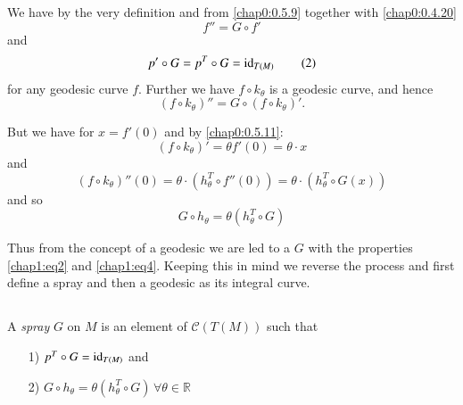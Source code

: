 We have by the very definition and from \ref{chap0:0.5.9} together with
\ref{chap0:0.4.20}
\begin{equation*}
f''=G\circ f'\tag{1}\label{chap1:eq1}
\end{equation*}
and
\begin{equation*}
p'\circ G=p^{T}\circ G=\operatorname{id}_{T(M)}\tag{2}\label{chap1:eq2}
\end{equation*}
for any geodesic curve $f$. Further we have $f\circ k_{\theta}$ is a
geodesic curve, and hence
\begin{equation*}
(f\circ k_{\theta})''=G\circ (f\circ k_{\theta})'.\tag{3}\label{chap1:eq3}
\end{equation*}

But we have for $x=f'(0)$ and by \ref{chap0:0.5.11}:
$$
(f\circ k_{\theta})'=\theta f'(0)=\theta\cdot x
$$
and
$$
(f\circ k_{\theta})''(0)=\theta\cdot (h^{T}_{\theta}\circ
f''(0))=\theta\cdot (h^{T}_{\theta}\circ G(x))
$$
and so
\begin{equation*}
G\circ h_{\theta}=\theta(h^{T}_{\theta}\circ G)\tag{4}\label{chap1:eq4}
\end{equation*}

Thus from the concept of a geodesic we are led to a $G$ with the
properties \eqref{chap1:eq2} and \eqref{chap1:eq4}. Keeping this in
mind we reverse the process and \pageoriginale first define a spray and
then a geodesic as its integral curve.

\setcounter{definition}{0}

\subsection{}\label{chap1:1.1.1}

\begin{defi*}
A {\em spray} $G$ on $M$ is an element of $\mathscr{C}(T(M))$ such
that
\begin{itemize}
\item[\rm 1)] $p^{T}\circ G=\operatorname{id}_{T(M)}$ and

\item[\rm 2)] $G\circ h_{\theta}=\theta(h^{T}_{\theta}\circ G) \, \forall
  \theta\in \mathbb{R}$
\end{itemize}
\end{defi*}

\setcounter{subsection}{1}

\subsection{}\label{chap1:1.1.2}

